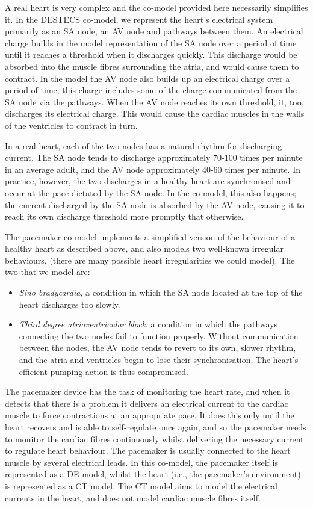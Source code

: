 A real heart is very complex and the co-model provided here
necessarily simplifies it.  In the DESTECS co-model, we represent the
heart's electrical system primarily as an SA node, an AV node and
pathways between them.  An electrical charge builds in the model
representation of the SA node over a period of time until it reaches a
threshold when it discharges quickly.  This discharge would be
absorbed into the muscle fibres surrounding the atria, and would cause
them to contract.  In the model the AV node also builds up an
electrical charge over a period of time; this charge includes some of
the charge communicated from the SA node via the pathways.  When the
AV node reaches its own threshold, it, too, discharges its electrical
charge.  This would cause the cardiac muscles in the walls of the
ventricles to contract in turn.

In a real heart, each of the two nodes has a natural rhythm for
discharging current.  The SA node tends to discharge approximately
70-100 times per minute in an average adult, and the AV node
approximately 40-60 times per minute.  In practice, however, the two
discharges in a healthy heart are synchronised and occur at the pace
dictated by the SA node.  In the co-model, this also happens; the
current discharged by the SA node is absorbed by the AV node, causing
it to reach its own discharge threshold more promptly that otherwise.

The pacemaker co-model implements a simplified version of the
behaviour of a healthy heart as described above, and also models two
well-known irregular behaviours, (there are many possible heart
irregularities we could model).  The two that we model are:

\begin{itemize}
\item \emph{Sino bradycardia}, a condition in which the SA node
  located at the top of the heart discharges too slowly.
\item \emph{Third degree atrioventricular block}, a condition in which
  the pathways connecting the two nodes fail to function properly.  Without communication between the nodes, the AV node tends to revert to
  its own, slower rhythm, and the atria and ventricles begin to lose
  their synchronisation.  The heart's efficient pumping action is thus
  compromised.
\end{itemize}

The pacemaker device has the task of monitoring the heart rate, and
when it detects that there is a problem it delivers an electrical
current to the cardiac muscle to force contractions at an appropriate
pace.  It does this only until the heart recovers and is able to
self-regulate once again, and so the pacemaker needs to monitor the
cardiac fibres continuously whilst delivering the necessary current to
regulate heart behaviour.  The pacemaker is usually connected to the
heart muscle by several electrical leads.  In this co-model, the
pacemaker itself is represented as a DE model, whilst the heart (i.e.,
the pacemaker's environment) is represented as a CT model.  The CT
model aims to model the electrical currents in the heart, and does not
model cardiac muscle fibres itself.

